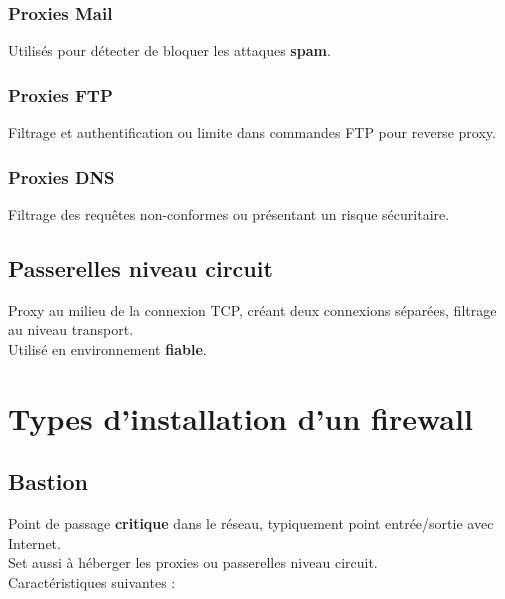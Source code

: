 \documentclass{report}
\begin{document}
			\subsubsection{Proxies Mail}

				Utilisés pour détecter de bloquer les attaques \textbf{spam}.\\

			\subsubsection{Proxies FTP}

				Filtrage et authentification ou limite dans commandes FTP pour reverse proxy.\\

			\subsubsection{Proxies DNS}

				Filtrage des requêtes non-conformes ou présentant un risque sécuritaire.\\

		\subsection{Passerelles niveau circuit}

			Proxy au milieu de la connexion TCP, créant deux connexions séparées, filtrage au niveau transport.\\

			Utilisé en environnement \textbf{fiable}.\\

	\section{Types d'installation d'un firewall}

		\subsection{Bastion}

			Point de passage \textbf{critique} dans le réseau, typiquement point entrée/sortie avec Internet.\\
			Set aussi à héberger les proxies ou passerelles niveau circuit.\\

			Caractéristiques suivantes : \\
\end{document}
